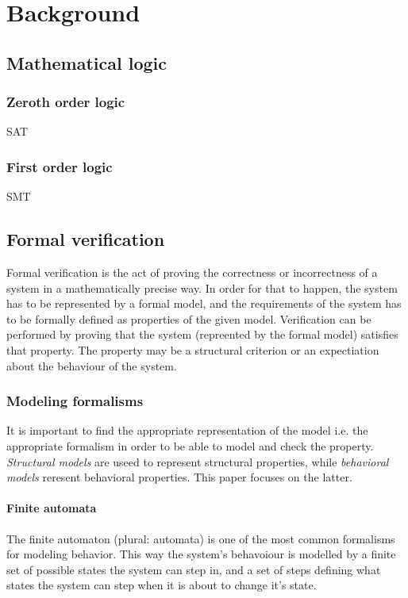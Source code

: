 \chapter{Background}
\label{chap:background}



\section{Mathematical logic}

\subsection{Zeroth order logic}
SAT
\subsection{First order logic}
SMT

\section{Formal verification}

Formal verification is the act of proving the correctness or incorrectness of a system in a mathematically precise way. In order for that to happen, the system has to be represented by a formal model, and the requirements of the system has to be formally defined as properties of the given model. Verification can be performed by proving that the system (repreented by the formal model) satisfies that property. The property may be a structural criterion or an expectiation about the behaviour of the system.

\subsection{Modeling formalisms}
It is important to find the appropriate representation of the model i.e. the appropriate formalism in order to be able to model and check the property. \emph{Structural models} are useed to represent structural properties, while \emph{behavioral models} reresent behavioral properties. This paper focuses on the latter.

\subsubsection{Finite automata}

The finite automaton (plural: automata)  is one of the most common formalisms for modeling behavior. This way the system's behavoiour is modelled by a finite set of possible states the system can step in, and a set of steps defining what states the system can step when it is about to change it's state.

